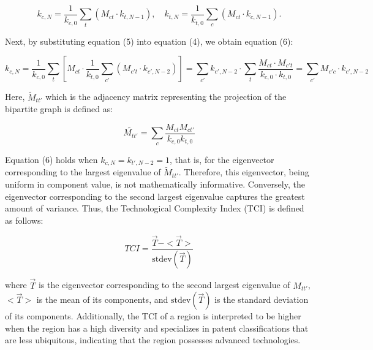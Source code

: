 \documentclass[fleqn,10pt]{wlscirep}
\begin{document}
\[
k_{c,N} = \frac{1}{k_{c,0}} \sum_{t} (M_{ct} \cdot k_{t,N-1}),\quad k_{t,N} = \frac{1}{k_{t,0}} \sum_{c} (M_{ct} \cdot k_{c,N-1}).
\]

Next, by substituting equation (5) into equation (4), we obtain equation (6):

\[
k_{c,N} = \frac{1}{k_{c,0}} \sum_{t} \left[ M_{ct} \cdot \frac{1}{k_{t,0}} \sum_{c'} \left( M_{c't} \cdot k_{c',N-2} \right) \right] = \sum_{c'} k_{c',N-2} \cdot \sum_{t} \frac{M_{ct} \cdot M_{c't}}{k_{c,0} \cdot k_{t,0}} = \sum_{c'} M_{c'c} \cdot k_{c',N-2}
\]

Here, \(\widetilde{M}_{tt'}\) which is the adjacency matrix representing the projection of the bipartite graph is defined as:

\[
\widetilde{M_{tt'}} = \sum_{c}{\frac{M_{ct}M_{ct'}}{k_{c,0}k_{t,0}}}
\]

Equation (6) holds when \(k_{c,N} = k_{t',N-2} = 1\), that is, for the eigenvector corresponding to the largest eigenvalue of \(\widetilde{M}_{tt'}\). 
Therefore, this eigenvector, being uniform in component value, is not mathematically informative. 
Conversely, the eigenvector corresponding to the second largest eigenvalue captures the greatest amount of variance. 
Thus, the Technological Complexity Index (TCI) is defined as follows:

\[
TCI = \frac{\vec{T}-<\vec{T}>}{\text{stdev}(\vec{T})}
\]

where \(\vec{T}\) is the eigenvector corresponding to the second largest eigenvalue of \(M_{tt'}\), \(<\vec{T}>\) is the mean of its components, and \(\text{stdev}(\vec{T})\) is the standard deviation of its components. 
Additionally, the TCI of a region is interpreted to be higher when the region has a high diversity and specializes in patent classifications that are less ubiquitous, indicating that the region possesses advanced technologies.
\end{document}
